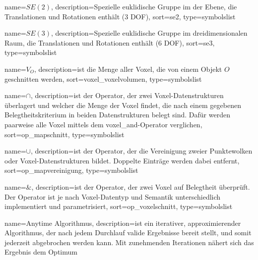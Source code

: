 


{
	name={\ensuremath{\mathit{SE}(2)}},
	description={Spezielle euklidische Gruppe im der Ebene, die Translationen und Rotationen enthält (3 DOF)},
	sort=se2, type=symbolslist
}

{
	name={\ensuremath{\mathit{SE}(3)}},
	description={Spezielle euklidische Gruppe im dreidimensionalen Raum, die Translationen und Rotationen enthält (6 DOF)},
	sort=se3, type=symbolslist
}

{
	name={\ensuremath{V_O}},
	description={ist die Menge aller Voxel, die von einem Objekt $O$ geschnitten werden},
	sort=voxel_voxelvolumen, type=symbolslist
}

{
	name={\ensuremath{\cap}},
	description={ist der Operator, der zwei Voxel-Datenstrukturen überlagert und welcher die Menge der Voxel findet, die nach einem gegebenen Belegtheitskriterium in beiden Datenstrukturen belegt sind. Dafür werden paarweise alle Voxel mittels dem \Gls{voxel_and}-Operator verglichen},
	sort=op_mapschnitt, type=symbolslist
}

{
	name={\ensuremath{\cup}},
	description={ist der Operator, der die Vereinigung zweier Punktewolken oder Voxel-Datenstrukturen bildet. Doppelte Einträge werden dabei entfernt},
	sort=op_mapvereinigung, type=symbolslist
}

{
	name={\ensuremath{\&}},
	description={ist der Operator, der zwei Voxel auf Belegtheit überprüft. Der Operator ist je nach Voxel-Datentyp und Semantik unterschiedlich implementiert und parametrisiert},
	sort=op_voxelschnitt, type=symbolslist
}




{
	name=Anytime Algorithmus,
	description={ist ein iterativer, approximierender Algorithmus, der nach jedem Durchlauf valide Ergebnisse bereit stellt, und somit jederzeit abgebrochen werden kann. Mit zunehmenden Iterationen nähert sich das Ergebnis dem Optimum}
}

